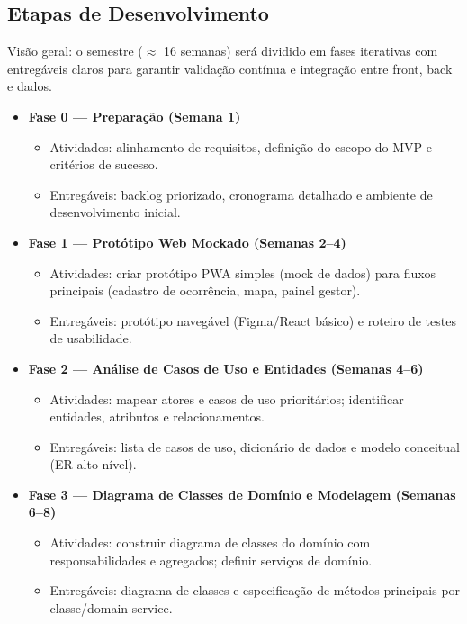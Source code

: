 \documentclass[12pt,a4paper]{article}
\begin{document}
\subsection{Etapas de Desenvolvimento}
\label{subsec:etapas-desenvolvimento}

Visão geral: o semestre (\(\approx\) 16 semanas) será dividido em fases iterativas com entregáveis claros para garantir validação contínua e integração entre front, back e dados.

\begin{itemize}
    \item \textbf{Fase 0 — Preparação (Semana 1)}
    \begin{itemize}
        \item Atividades: alinhamento de requisitos, definição do escopo do MVP e critérios de sucesso.
        \item Entregáveis: backlog priorizado, cronograma detalhado e ambiente de desenvolvimento inicial.
    \end{itemize}
    
    \item \textbf{Fase 1 — Protótipo Web Mockado (Semanas 2–4)}
    \begin{itemize}
        \item Atividades: criar protótipo PWA simples (mock de dados) para fluxos principais (cadastro de ocorrência, mapa, painel gestor).
        \item Entregáveis: protótipo navegável (Figma/React básico) e roteiro de testes de usabilidade.
    \end{itemize}
    
    \item \textbf{Fase 2 — Análise de Casos de Uso e Entidades (Semanas 4–6)}
    \begin{itemize}
        \item Atividades: mapear atores e casos de uso prioritários; identificar entidades, atributos e relacionamentos.
        \item Entregáveis: lista de casos de uso, dicionário de dados e modelo conceitual (ER alto nível).
    \end{itemize}
    
    \item \textbf{Fase 3 — Diagrama de Classes de Domínio e Modelagem (Semanas 6–8)}
    \begin{itemize}
        \item Atividades: construir diagrama de classes do domínio com responsabilidades e agregados; definir serviços de domínio.
        \item Entregáveis: diagrama de classes e especificação de métodos principais por classe/domain service.
    \end{itemize}
    

\end{itemize}
\end{document}
